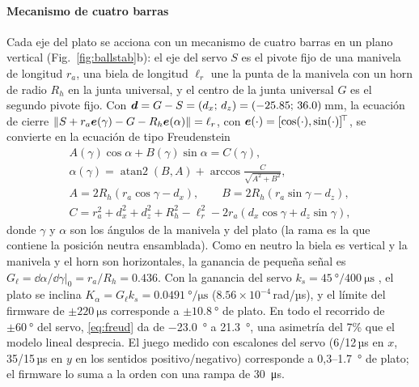 \paragraph{Mecanismo de cuatro barras}
Cada eje del plato se acciona con un mecanismo de cuatro barras en un plano vertical (Fig.~\ref{fig:ballstab}b): el eje del servo $S$ es el pivote fijo de una manivela de longitud $r_a$, una biela de longitud $\ell_r$ une la punta de la manivela con un horn de radio $R_h$ en la junta universal, y el centro de la junta universal $G$ es el segundo pivote fijo. Con $\bm{d}=G-S=(d_x;\,d_z)=(-25.85;\,36.0)$\,mm, la ecuación de cierre $\|S+r_a\bm{e}(\gamma)-G-R_h\bm{e}(\alpha)\|=\ell_r$, con $\bm{e}(\cdot)=[\cos(\cdot),\sin(\cdot)]^{\!\top}$, se convierte en la ecuación de tipo Freudenstein \cite{freudenstein1955}
\begin{gather}
  A(\gamma)\cos\alpha+B(\gamma)\sin\alpha=C(\gamma), \nonumber\\
  \alpha(\gamma)=\operatorname{atan2}(B,A)+\arccos\frac{C}{\sqrt{A^2+B^2}}, \label{eq:freud}\\
  A=2R_h(r_a\cos\gamma-d_x),\qquad B=2R_h(r_a\sin\gamma-d_z), \nonumber\\
  C=r_a^2+d_x^2+d_z^2+R_h^2-\ell_r^2-2r_a(d_x\cos\gamma+d_z\sin\gamma), \nonumber
\end{gather}
donde $\gamma$ y $\alpha$ son los ángulos de la manivela y del plato (la rama es la que contiene la posición neutra ensamblada). Como en neutro la biela es vertical y la manivela y el horn son horizontales, la ganancia de pequeña señal es $G_\ell=\dd\alpha/\dd\gamma|_0=r_a/R_h=0.436$. Con la ganancia del servo $k_s=\SI{45}{\degree}/\SI{400}{\micro\second}$ \cite{futaba_s3003}, el plato se inclina $K_\alpha=G_\ell k_s=\SI{0.0491}{\degree\per\micro\second}$ ($8.56\times10^{-4}$\,rad/µs), y el límite del firmware de $\pm\SI{220}{\micro\second}$ corresponde a $\pm\SI{10.8}{\degree}$ de plato. En todo el recorrido de $\pm\SI{60}{\degree}$ del servo, \eqref{eq:freud} da de \SI{-23.0}{\degree} a \SI{21.3}{\degree}, una asimetría del 7\% que el modelo lineal desprecia. El juego medido con escalones del servo (6/12\,µs en $x$, 35/15\,µs en $y$ en los sentidos positivo/negativo) corresponde a 0,3--\SI{1.7}{\degree} de plato; el firmware lo suma a la orden con una rampa de \SI{30}{\micro\second}.

